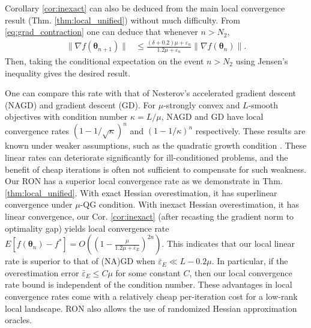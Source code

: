 \documentclass[11pt]{amsart}
\theoremstyle{plain}
\theoremstyle{definition}
\theoremstyle{remark}
\def\eps{\varepsilon}
\def\param{\boldsymbol{\theta}}
\begin{document}
Corollary \ref{cor:inexact} can also be deduced from the main local convergence result (Thm. \ref{thm:local_unified}) without much difficulty. 
From \eqref{eq:grad_contraction} one can deduce that whenever $n>N_{2}$, 
\begin{align*}
\|\nabla f(\param_{n+1})\| &\le \frac{(\delta+0.2)\mu+\eps_n}{1.2\mu+\eps_n}\|\nabla f(\param_n)\|. 
\end{align*}
Then, taking the conditional expectation on the event $n> N_2$ using Jensen's inequality gives the desired result. 
{
    
One can compare this rate with that of Nesterov's accelerated gradient descent (NAGD) and gradient descent (GD). For $\mu$-strongly convex and $L$-smooth objectives with condition number $\kappa=L/\mu$, NAGD and GD have local convergence rates $(1-1/\sqrt{\kappa})^n$ and $(1-1/\kappa)^n$ respectively. These results are known under weaker assumptions, such as the quadratic growth condition \cite{necoara2019linear}. These linear rates can deteriorate significantly for ill-conditioned problems, and the benefit of cheap iterations is often not sufficient to compensate for such weakness. Our RON has a superior local convergence rate as we demonstrate in Thm. \ref{thm:local_unified}. With exact Hessian overestimation, it has superlinear convergence under $\mu$-QG condition. With inexact Hessian overestimation, it has linear convergence, our Cor. \ref{cor:inexact} (after recasting the gradient norm to optimality gap) yields local convergence rate $E[f(\param_n)-f^*]=O((1-\frac{\mu}{1.2\mu+\bar{\eps}_{E}})^{2n}).$ This indicates that our local linear rate is superior to that of (NA)GD when $\bar{\eps}_{E}\ll L-0.2\mu$. In particular, if the overestimation error $\bar{\eps}_E\le C\mu$ for some constant $C$, then our local convergence rate bound is independent of the condition number. These advantages in local convergence rates come with a relatively cheap per-iteration cost for a low-rank local landscape. RON also allows the use of randomized Hessian approximation oracles. 
}
\end{document}
